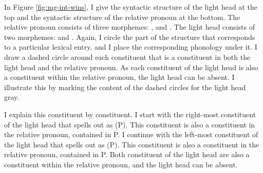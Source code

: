 In Figure \ref{fig:mg-int-wins}, I give the syntactic structure of the light head at the top and the syntactic structure of the relative pronoun at the bottom.
The relative pronoun consists of three morphemes: ,  and .
The light head consists of two morphemes:  and .
Again, I circle the part of the structure that corresponds to a particular lexical entry, and I place the corresponding phonology under it.
I draw a dashed circle around each constituent that is a constituent in both the light head and the relative pronoun.
As each constituent of the light head is also a constituent within the relative pronoun, the light head can be absent. I illustrate this by marking the content of the dashed circles for the light head gray.

I explain this constituent by constituent.
I start with the right-most constituent of the light head that spells out as  (P). This constituent is also a constituent in the relative pronoun, contained in P.
I continue with the left-most constituent of the light head that spells out as  (P). This constituent is also a constituent in the relative pronoun, contained in P.
Both constituent of the light head are also a constituent within the relative pronoun, and the light head can be absent.

